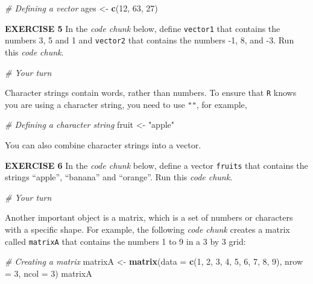 \documentclass[
]{article}
\newenvironment{Shaded}{\begin{snugshade}}{\end{snugshade}}
\newcommand{\CommentTok}[1]{\textcolor[rgb]{0.56,0.35,0.01}{\textit{#1}}}
\newcommand{\DataTypeTok}[1]{\textcolor[rgb]{0.13,0.29,0.53}{#1}}
\newcommand{\DecValTok}[1]{\textcolor[rgb]{0.00,0.00,0.81}{#1}}
\newcommand{\KeywordTok}[1]{\textcolor[rgb]{0.13,0.29,0.53}{\textbf{#1}}}
\newcommand{\NormalTok}[1]{#1}
\newcommand{\StringTok}[1]{\textcolor[rgb]{0.31,0.60,0.02}{#1}}
\begin{document}
\begin{Shaded}
\begin{Highlighting}[]
\CommentTok{# Defining a vector}
\NormalTok{ages <-}\StringTok{ }\KeywordTok{c}\NormalTok{(}\DecValTok{12}\NormalTok{, }\DecValTok{63}\NormalTok{, }\DecValTok{27}\NormalTok{)}
\end{Highlighting}
\end{Shaded}

\textbf{EXERCISE 5} In the \emph{code chunk} below, define
\texttt{vector1} that contains the numbers 3, 5 and 1 and
\texttt{vector2} that contains the numbers -1, 8, and -3. Run this
\emph{code chunk}.

\begin{Shaded}
\begin{Highlighting}[]
\CommentTok{# Your turn}
\end{Highlighting}
\end{Shaded}

Character strings contain words, rather than numbers. To ensure that
\texttt{R} knows you are using a character string, you need to use
\texttt{""}, for example,

\begin{Shaded}
\begin{Highlighting}[]
\CommentTok{# Defining a character string}
\NormalTok{fruit <-}\StringTok{ "apple"}
\end{Highlighting}
\end{Shaded}

You can also combine character strings into a vector.

\textbf{EXERCISE 6} In the \emph{code chunk} below, define a vector
\texttt{fruits} that contains the strings ``apple'', ``banana'' and
``orange''. Run this \emph{code chunk}.

\begin{Shaded}
\begin{Highlighting}[]
\CommentTok{# Your turn}
\end{Highlighting}
\end{Shaded}

Another important object is a matrix, which is a set of numbers or
characters with a specific shape. For example, the following \emph{code
chunk} creates a matrix called \texttt{matrixA} that contains the
numbers 1 to 9 in a 3 by 3 grid:

\begin{Shaded}
\begin{Highlighting}[]
\CommentTok{# Creating a matrix}
\NormalTok{matrixA <-}\StringTok{ }\KeywordTok{matrix}\NormalTok{(}\DataTypeTok{data =} \KeywordTok{c}\NormalTok{(}\DecValTok{1}\NormalTok{, }\DecValTok{2}\NormalTok{, }\DecValTok{3}\NormalTok{, }\DecValTok{4}\NormalTok{, }\DecValTok{5}\NormalTok{, }\DecValTok{6}\NormalTok{, }\DecValTok{7}\NormalTok{, }\DecValTok{8}\NormalTok{, }\DecValTok{9}\NormalTok{), }
                  \DataTypeTok{nrow =} \DecValTok{3}\NormalTok{, }
                  \DataTypeTok{ncol =} \DecValTok{3}\NormalTok{)}
\NormalTok{matrixA}
\end{Highlighting}
\end{Shaded}
\end{document}
